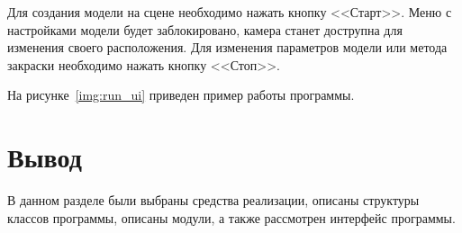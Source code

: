 \newpage
Для создания модели на сцене необходимо нажать кнопку <<Старт>>. 
Меню с настройками модели будет заблокировано, камера станет дострупна для изменения своего расположения.
Для изменения параметров модели или метода закраски необходимо нажать кнопку <<Стоп>>.

На рисунке~\ref{img:run_ui} приведен пример работы программы.

\section*{Вывод}

В данном разделе были выбраны средства реализации, описаны структуры классов программы, описаны модули, а также рассмотрен интерфейс программы.
